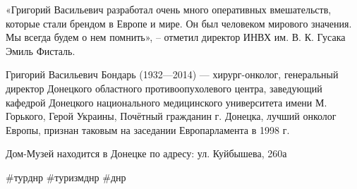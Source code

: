 «Григорий Васильевич разработал очень много оперативных вмешательств, которые
стали брендом в Европе и мире. Он был человеком мирового значения. Мы всегда
будем о нем помнить», – отметил директор ИНВХ им. В. К. Гусака Эмиль Фисталь.

Григорий Васильевич Бондарь (1932—2014) — хирург-онколог, генеральный директор
Донецкого областного противоопухолевого центра, заведующий кафедрой Донецкого
национального медицинского университета имени М. Горького, Герой Украины,
Почётный гражданин г. Донецка, лучший онколог Европы, признан таковым на
заседании Европарламента в 1998 г.

Дом-Музей находится в Донецке по адресу: ул. Куйбышева, 260а

\#турднр \#туризмднр \#днр

